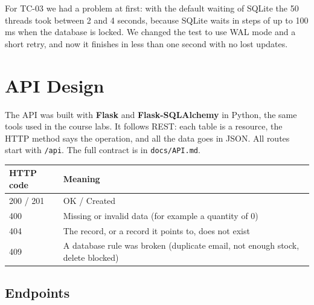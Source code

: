\documentclass[11pt]{article}
\renewcommand{\_}{\oldus\allowbreak}
\begin{document}
For TC-03 we had a problem at first: with the default waiting of SQLite the 50 threads took between
2 and 4 seconds, because SQLite waits in steps of up to 100 ms when the database is locked. We
changed the test to use WAL mode and a short retry, and now it finishes in less than one second
with no lost updates.

\section{API Design}

The API was built with \textbf{Flask} and \textbf{Flask-SQLAlchemy} in Python, the same tools used
in the course labs. It follows REST: each table is a resource, the HTTP method says the operation,
and all the data goes in JSON. All routes start with \texttt{/api}. The full contract is in
\texttt{docs/API.md}.

\begin{center}
\begin{tabular}{p{2.4cm} p{9cm}}
\toprule
\textbf{HTTP code} & \textbf{Meaning} \\
\midrule
200 / 201 & OK / Created \\
400 & Missing or invalid data (for example a quantity of 0) \\
404 & The record, or a record it points to, does not exist \\
409 & A database rule was broken (duplicate email, not enough stock, delete blocked) \\
\bottomrule
\end{tabular}
\end{center}

\subsection{Endpoints}
\end{document}
